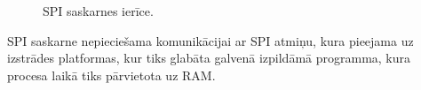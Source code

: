 	\begin{figure}[thp]
		\centering
		\def\svgscale{1.25}
		{\ttfamily\scriptsize}
		\caption{SPI saskarnes ierīce.}
		\label{fig:spi}
	\end{figure}
	
	SPI saskarne nepieciešama komunikācijai ar SPI  atmiņu,
	kura pieejama uz izstrādes platformas,\cite[43.~lpp.]{FusionGuide}
	kur tiks glabāta galvenā izpildāmā programma, kura  procesa
	laikā tiks pārvietota uz RAM.
